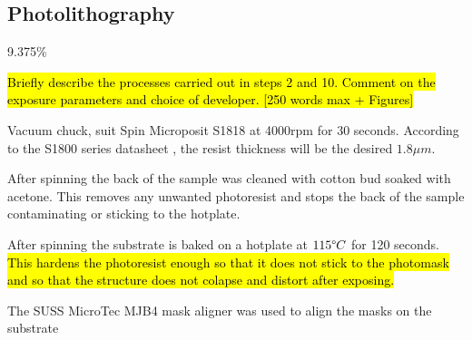 \subsection{Photolithography}
\label{sec:fab:photolithography}

9.375\%

\hl{Briefly describe the processes carried out in steps 2 and 10. Comment on the exposure parameters and choice of developer. [250 words max + Figures]}

Vacuum chuck, suit
Spin Microposit S1818 at 4000rpm for 30 seconds. According to the S1800 series datasheet \cite{s18}, the resist thickness will be the desired $1.8\mu m$.

After spinning the back of the sample was cleaned with cotton bud soaked with acetone. This removes any unwanted photoresist and stops the back of the sample contaminating or sticking to the hotplate.

After spinning the substrate is baked on a hotplate at $115\degree C$ for 120 seconds. \hl{This hardens the photoresist enough so that it does not stick to the photomask and so that the structure does not colapse and distort after exposing.}

The SUSS MicroTec MJB4 mask aligner was used to align the masks on the substrate
